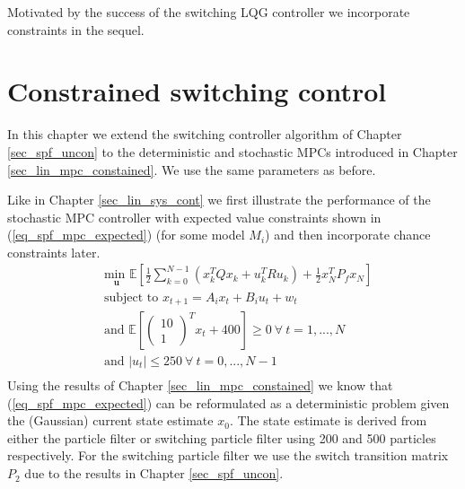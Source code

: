 Motivated by the success of the switching LQG controller we incorporate constraints in the sequel.

\section{Constrained switching control} 
In this chapter we extend the switching controller algorithm of Chapter \ref{sec_spf_uncon} to the deterministic and stochastic MPCs introduced in Chapter \ref{sec_lin_mpc_constained}. We use the same parameters as before.

Like in Chapter \ref{sec_lin_sys_cont} we first illustrate the performance of the stochastic MPC controller with expected value constraints shown in (\ref{eq_spf_mpc_expected}) (for some model $M_i$) and then incorporate chance constraints later.
\begin{equation}
\begin{aligned}
&\underset{\mathbf{u}}{\text{min }} \mathbb{E}\left[ \frac{1}{2}\sum_{k=0}^{N-1} \left( x_k^TQx_k + u_k^TRu_k \right) + \frac{1}{2}x_N^TP_fx_N \right] \\
& \text{subject to } x_{t+1}=A_ix_t+B_iu_t + w_t\\
& \text{and } \mathbb{E}[\begin{pmatrix}
10 \\ 1
\end{pmatrix}^Tx_t + 400] \geq 0 ~\forall ~t=1,...,N \\
& \text{and } |u_t| \leq 250 ~\forall ~t=0,...,N-1\\
\end{aligned}
\label{eq_spf_mpc_expected}
\end{equation} 
Using the results of Chapter \ref{sec_lin_mpc_constained} we know that (\ref{eq_spf_mpc_expected}) can be reformulated as a deterministic problem given the (Gaussian) current state estimate $x_0$. The state estimate is derived from either the particle filter or switching particle filter using 200 and 500 particles respectively. For the switching particle filter we use the switch transition matrix $P_2$ due to the results in Chapter \ref{sec_spf_uncon}.

